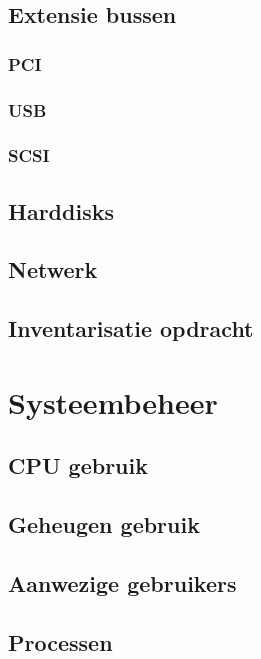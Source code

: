 \documentclass[a4paper,12pt,twoside,openright,titlepage]{book}
\begin{document}
\section{Extensie bussen}
\subsection{PCI}

\subsection{USB}

\subsection{SCSI}

\section{Harddisks}





\section{Netwerk}

\section{Inventarisatie opdracht}


\chapter{Systeembeheer}

\section{CPU gebruik}

\section{Geheugen gebruik}

\section{Aanwezige gebruikers}

\section{Processen}
\end{document}
